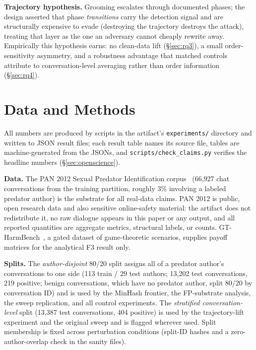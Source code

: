 \documentclass[letterpaper,twocolumn,10pt]{article}
\begin{document}
\textbf{Trajectory hypothesis.} Grooming escalates through documented
phases; the design asserted that phase \emph{transitions} carry the
detection signal and are structurally expensive to evade (destroying the
trajectory destroys the attack), treating that layer as the one an adversary
cannot cheaply rewrite away.
Empirically this hypothesis earns: no clean-data lift (\S\ref{sec:rq3}), a
small order-sensitivity asymmetry, and a robustness advantage that matched
controls attribute to conversation-level averaging rather than order
information (\S\ref{sec:rq4}).

\section{Data and Methods}
\label{sec:methods}

All numbers are produced by scripts in the artifact's \texttt{experiments/}
directory and written to JSON result files; each result table names its
source file, tables are machine-generated from the JSONs, and
\texttt{scripts/check\_claims.py} verifies the headline numbers
(\S\ref{sec:openscience}).

\textbf{Data.} The PAN 2012 Sexual Predator Identification
corpus~\cite{villatoro2012} (66{,}927 chat conversations from the training
partition, roughly 3\% involving a labeled predator author) is the
substrate for all real-data claims. PAN 2012 is public, open research data
and also sensitive online-safety material: the artifact does not
redistribute it, no raw dialogue appears in this paper or any output, and
all reported quantities are aggregate metrics, structural labels, or counts.
GT-HarmBench~\cite{gtharmbench2026}, a gated dataset of game-theoretic
scenarios, supplies payoff matrices for the analytical F3 result only.

\textbf{Splits.} The \emph{author-disjoint} 80/20 split assigns all of a
predator author's conversations to one side (113 train / 29 test authors;
13{,}202 test conversations, 219 positive; benign conversations, which have
no predator author, split 80/20 by conversation ID) and is used by the
MinHash frontier, the FP-substrate analysis, the sweep replication, and all
control experiments. The \emph{stratified conversation-level} split (13{,}387
test conversations, 404 positive) is used by the trajectory-lift experiment
and the original sweep and is flagged wherever used. Split membership is
fixed across perturbation conditions (split-ID hashes and a
zero-author-overlap check in the sanity files).
\end{document}
